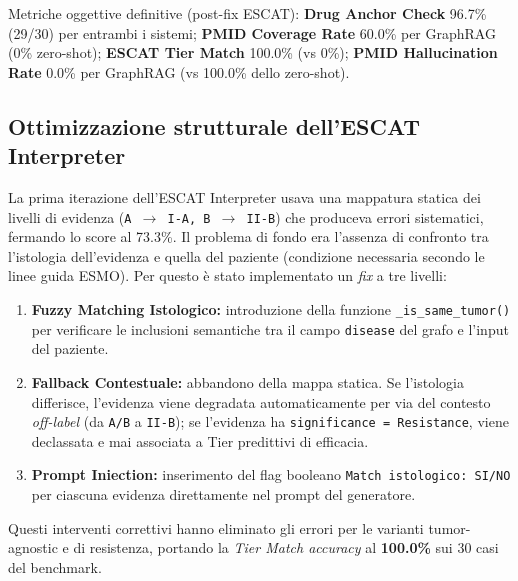 \documentclass[11pt,a4paper]{article}
\newcommand{\code}[1]{\texttt{\small #1}}
\begin{document}
\noindent Metriche oggettive definitive (post-fix ESCAT): \textbf{Drug Anchor Check} 96.7\% (29/30) per entrambi i sistemi; \textbf{PMID Coverage Rate} 60.0\% per GraphRAG (0\% zero-shot); \textbf{ESCAT Tier Match} 100.0\% (vs 0\%); \textbf{PMID Hallucination Rate} 0.0\% per GraphRAG (vs 100.0\% dello zero-shot).

\subsection{Ottimizzazione strutturale dell'ESCAT Interpreter}
La prima iterazione dell'ESCAT Interpreter usava una mappatura statica dei livelli di evidenza (\code{A $\to$ I-A, B $\to$ II-B}) che produceva errori sistematici, fermando lo score al 73.3\%. Il problema di fondo era l'assenza di confronto tra l'istologia dell'evidenza e quella del paziente (condizione necessaria secondo le linee guida ESMO). 
Per questo \`e stato implementato un \emph{fix} a tre livelli:
\begin{enumerate}
\item \textbf{Fuzzy Matching Istologico:} introduzione della funzione \code{\_is\_same\_tumor()} per verificare le inclusioni semantiche tra il campo \code{disease} del grafo e l'input del paziente.
\item \textbf{Fallback Contestuale:} abbandono della mappa statica. Se l'istologia differisce, l'evidenza viene degradata automaticamente per via del contesto \emph{off-label} (da \code{A/B} a \code{II-B}); se l'evidenza ha \code{significance = Resistance}, viene declassata e mai associata a Tier predittivi di efficacia.
\item \textbf{Prompt Iniection:} inserimento del flag booleano \code{Match istologico: SI/NO} per ciascuna evidenza direttamente nel prompt del generatore.
\end{enumerate}
Questi interventi correttivi hanno eliminato gli errori per le varianti tumor-agnostic e di resistenza, portando la \emph{Tier Match accuracy} al \textbf{100.0\%} sui 30 casi del benchmark.
\end{document}
